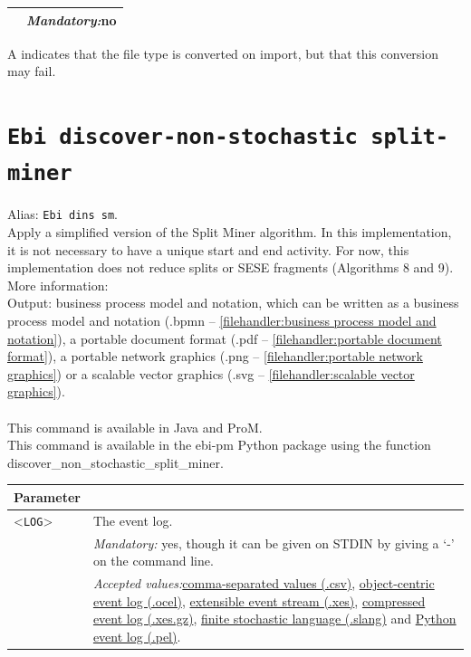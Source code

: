 {\begin{tabularx}{\linewidth}{lX}
&\textit{Mandatory:}\quad no\\
\bottomrule
\end{tabularx}
A \textdagger{} indicates that the file type is converted on import, but that this conversion may fail.
\clearpage\section{\texttt{Ebi discover-non-stochastic split-miner}}
\label{command:Ebi discover-non-stochastic split-miner}
Alias: \texttt{Ebi dins sm}.\\
Apply a simplified version of the Split Miner algorithm.
        In this implementation, it is not necessary to have a unique start and end activity.
        For now, this implementation does not reduce splits or SESE fragments (Algorithms 8 and 9).\\
More information: \cite{DBLP:journals/kais/AugustoCDRP19}~\\
\noindent Output: business process model and notation, which can be written as a business process model and notation (.bpmn -- \cref{filehandler:business process model and notation}), a portable document format (.pdf -- \cref{filehandler:portable document format}), a portable network graphics (.png -- \cref{filehandler:portable network graphics}) or a scalable vector graphics (.svg -- \cref{filehandler:scalable vector graphics}).\\
\\This command is available in Java and ProM.
\\This command is available in the ebi-pm Python package using the function discover\_non\_stochastic\_split\_miner.
\begin{tabularx}{\linewidth}{lX}
\toprule
Parameter \\\midrule
<\texttt{LOG}>&The event log.\\
&\textit{Mandatory:} \quad yes, though it can be given on STDIN by giving a `-' on the command line.\\
&\textit{Accepted values:}\quad \hyperref[filehandler:comma-separated values]{comma-separated values (.csv)}, \hyperref[filehandler:object-centric event log]{object-centric event log (.ocel)}, \hyperref[filehandler:extensible event stream]{extensible event stream (.xes)}, \hyperref[filehandler:compressed event log]{compressed event log (.xes.gz)}, \hyperref[filehandler:finite stochastic language]{finite stochastic language (.slang)} and \hyperref[filehandler:Python event log]{Python event log (.pel)}.\\

\end{tabularx}}
